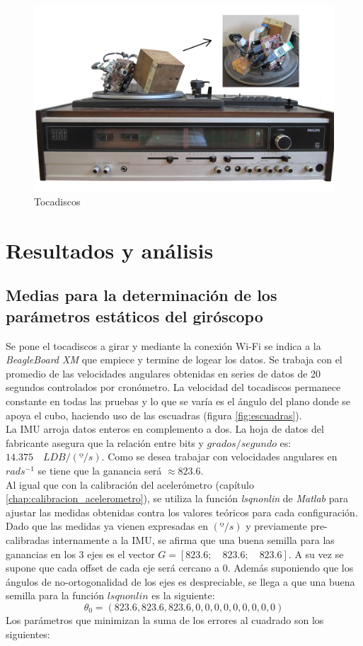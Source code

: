 \documentclass[main]{subfiles}
\begin{document}
\begin{figure}[h!]
	\centering
	\includegraphics[width=.9\textwidth]{./pics_gyro/tocadiscos.jpg}
	\caption{Tocadiscos}
	\label{fig:tocadiscos}
\end{figure}


\section{Resultados y análisis}
\subsection{Medias para la determinaci\'on de los par\'ametros est\'aticos del giróscopo}
Se pone el tocadiscos a girar y mediante la conexión Wi-Fi se indica a la \emph{BeagleBoard XM} que empiece y termine de logear los datos. Se trabaja con el promedio de las velocidades angulares obtenidas en series de datos de 20 segundos controlados por cronómetro. La velocidad del tocadiscos permanece constante en todas las pruebas y lo que se varía es el ángulo del plano donde se apoya el cubo, haciendo uso de las escuadras (figura \ref{fig:escuadras}).\\

La IMU arroja datos enteros en complemento a dos. La hoja de datos del fabricante asegura que la relaci\'on entre bits y $grados/segundo$ es: $14.375\quad LDB/(º/s)$. Como se desea trabajar con velocidades angulares en $rad s^{-1}$ se tiene que la ganancia ser\'a $\approx 823.6$.\\

Al igual que con la calibración del acelerómetro (capítulo \ref{chap:calibracion_acelerometro}), se utiliza la función \emph{lsqnonlin} de \emph{Matlab} para ajustar las medidas obtenidas contra los valores teóricos para cada configuración. Dado que las medidas ya vienen expresadas en $(º/s)$ y previamente pre-calibradas internamente a la IMU, se afirma que una buena semilla para las ganancias en los 3 ejes es el vector $G=[823.6;\quad 823.6;\quad 823.6]$. A su vez se supone que cada offset de cada eje será cercano a 0. Además suponiendo que los ángulos de no-ortogonalidad de los ejes es despreciable, se llega a que una buena semilla para la función $lsqnonlin$ es la siguiente:
$$\theta _0=\left(823.6,823.6,823.6,0,0,0,0,0,0,0,0,0\right)$$
Los parámetros que minimizan la suma de los errores al cuadrado son los siguientes:
\end{document}
